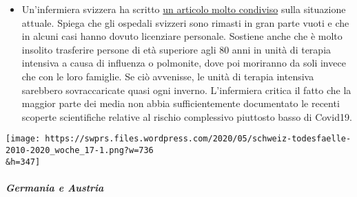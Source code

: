 \begin{itemize}
{  svizzero merita il carcere?''} Il giornalista svizzero Reto Brennwald
  ha intervistato l'imprenditore
  \href{https://www.youtube.com/user/timturpis/videos}{Daniel Stricker},
  che si è rifugiato temporaneamente in Svezia a metà marzo e ha
  criticato fortemente la politica Covid19 del governo svizzero.
\item
  Un'infermiera svizzera ha scritto
  \href{https://www.facebook.com/simone.christinat/posts/10221314943115981}{un
  articolo molto condiviso} sulla situazione attuale. Spiega che gli
  ospedali svizzeri sono rimasti in gran parte vuoti e che in alcuni
  casi hanno dovuto licenziare personale. Sostiene anche che è molto
  insolito trasferire persone di età superiore agli 80 anni in unità di
  terapia intensiva a causa di influenza o polmonite, dove poi moriranno
  da soli invece che con le loro famiglie. Se ciò avvenisse, le unità di
  terapia intensiva sarebbero sovraccaricate quasi ogni inverno.
  L'infermiera critica il fatto che la maggior parte dei media non abbia
  sufficientemente documentato le recenti scoperte scientifiche relative
  al rischio complessivo piuttosto basso di Covid19.
\end{itemize}

\texttt{[image: https://swprs.files.wordpress.com/2020/05/schweiz-todesfaelle-2010-2020\_woche\_17-1.png?w=736\\\&h=347]}

\hypertarget{germania-e-austria}{%
\subparagraph{\texorpdfstring{\textbf{Germania e
Austria}}{Germania e Austria}}\label{germania-e-austria}}

